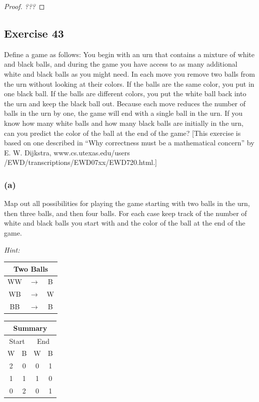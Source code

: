 \documentclass[14pt]{extarticle}
\newcommand{\cy}{\color{cyan}}
\begin{document}
\begin{proof}
{\it ???}
\end{proof}

\subsection{Exercise 43}
Define a game as follows: You begin with an urn that contains a mixture of white and black balls, and during the game you have access to as many additional white and black balls as you might need. In each move you remove two balls from the urn without looking at their colors. If the balls
are the same color, you put in one black ball. If the balls are different colors, you put the white ball back into the urn and keep the black ball out. Because each move reduces the number of balls in the urn by one, the game will end with a single ball in the urn. If you know how many white balls and how many black balls are initially in the urn, can you predict the color of the ball at the end of the game? [This exercise is based on one described in “Why correctness must be a mathematical concern” by E. W. Dijkstra, www.cs.utexas.edu/users /EWD/transcriptions/EWD07xx/EWD720.html.]

\subsubsection{(a)}
Map out all possibilities for playing the game starting with two balls in the urn, then three balls, and then four balls. For each case keep track of the number of white and black balls you start with and the color of the ball at the
end of the game.

{\it Hint:}
\begin{tabular}{|ccc|}
\hline
\multicolumn{3}{|c|}{\cy Two Balls} \\
\hline
WW & $\to$ & B \\
\hline
WB & $\to$ & W \\
\hline
BB & $\to$ & B \\
\hline
\end{tabular}
\begin{tabular}{|cc|cc|}
\hline
\multicolumn{4}{|c|}{\cy Summary} \\
\hline
\multicolumn{2}{|c|}{Start} & \multicolumn{2}{c|}{End} \\
\hline
W & B & W & B \\
\hline
2 & 0 & 0 & 1 \\
\hline
1 & 1 & 1 & 0 \\
\hline
0 & 2 & 0 & 1 \\
\hline
\end{tabular}
\end{document}
